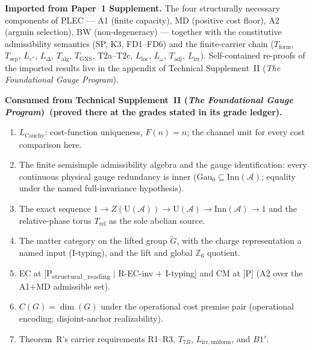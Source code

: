 \documentclass[11pt]{article}
\theoremstyle{definition}
\newcommand{\TSII}{Technical Supplement~II (\emph{The Foundational Gauge Program})}
\begin{document}
\medskip
\begin{tcolorbox}[apfbox, title={What Is Assumed, What Is Proved, What Is Deferred}]

\textbf{Imported from Paper~1 Supplement.}  The four structurally
necessary components of PLEC --- A1 (finite capacity), MD (positive
cost floor), A2 (argmin selection), BW (non-degeneracy) --- together
with the constitutive admissibility semantics (SP, K3, FD1--FD6) and
the finite-carrier chain ($T_{\mathrm{form}}$, $T_{\mathrm{sep}}$,
$L_{\varepsilon^*}$, $L_\Delta$, $T_{\mathrm{alg}}$,
$T_{\mathrm{GNS}}$, T2a--T2c, $L_{\mathrm{loc}}$, $L_\omega$,
$T_{\mathrm{adj}}$, $L_{\mathrm{irr}}$).  Self-contained re-proofs of
the imported results live in the appendix of \TSII.

\smallskip\noindent\textbf{Consumed from \TSII\ (proved there at the
grades stated in its grade ledger).}
\begin{enumerate}[nosep,label=\arabic*.,leftmargin=2em]
  \item $L_{\mathrm{Cauchy}}$: cost-function uniqueness, $F(n)=n$; the
  channel unit for every cost comparison here.
  \item The finite semisimple admissibility algebra and the gauge
  identification: every continuous physical gauge redundancy is inner
  ($\mathrm{Gau}_0 \subseteq \mathrm{Inn}(\mathcal{A})$; equality
  under the named full-invariance hypothesis).
  \item The exact sequence $1 \to Z(\mathrm{U}(\mathcal{A})) \to
  \mathrm{U}(\mathcal{A}) \to \mathrm{Inn}(\mathcal{A}) \to 1$ and the
  relative-phase torus $T_{\mathrm{rel}}$ as the sole abelian source.
  \item The matter category on the lifted group $\widetilde{G}$, with
  the charge representation a named input (I-typing), and the lift and
  global $\mathbb{Z}_6$ quotient.
  \item EC at [P\textsubscript{structural\_reading} $\mid$ R-EC-inv
  $+$ I-typing] and CM at [P] (A2 over the A1$+$MD admissible set).
  \item $C(G) = \dim(G)$ under the operational cost premise pair
  (operational encoding; disjoint-anchor realizability).
  \item Theorem~R's carrier requirements R1--R3, $T_{7B}$,
  $L_{\mathrm{irr,uniform}}$, and $B1'$.
\end{enumerate}


\end{tcolorbox}
\end{document}
